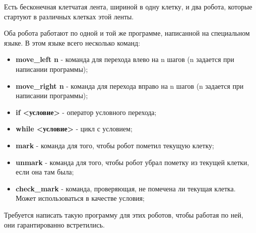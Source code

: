 \begin{problem}

Есть бесконечная клетчатая лента, шириной в одну клетку, и два робота, которые стартуют в различных клетках этой ленты.

Оба робота работают по одной и той же программе, написанной на специальном языке.
В этом языке всего несколько команд:
\begin{itemize}
\item \textbf{move\_left n} - команда для перехода влево на n шагов (n задается при написании программы);
\item \textbf{move\_right n} - команда для перехода вправо на n шагов (n задается при написании программы);
\item \textbf{if <условие>} - оператор условного перехода;
\item \textbf{while <условие>} - цикл с условием;
\item \textbf{mark} - команда для того, чтобы робот пометил текущую клетку;
\item \textbf{unmark} - команда для того, чтобы робот убрал пометку из текущей клетки, если она там была;
\item \textbf{check\_mark} - команда, проверяющая, не помечена ли текущая клетка. Может использоваться в качестве условия;
\end{itemize}

Требуется написать такую программу для этих роботов, чтобы работая по ней, они гарантированно встретились.

\end{problem}